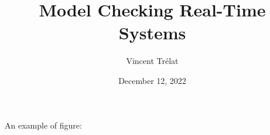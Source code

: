 \documentclass{beamer}
\title[Model Checking Real-Time Systems]{Model Checking Real-Time Systems}
\date{December 12, 2022}
\author[V. Trélat]{Vincent Trélat}
\institute[TUM]{Technical University of Munich}
\theoremstyle{definition}
\begin{document}
\begin{frame}
\titlepage
\end{frame}

\begin{frame}
  An example of figure:
  \begin{figure}
  \end{figure}
\end{frame}
\end{document}
